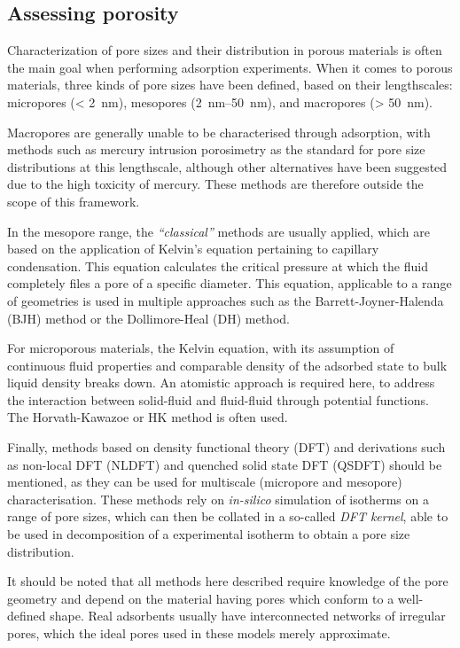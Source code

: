 
\subsection{Assessing porosity}

Characterization of pore sizes and their distribution in porous materials
is often the main goal when performing adsorption experiments.
When it comes to porous materials, three kinds of pore sizes have been
defined, based on their lengthscales: micropores (\SI{< 2}{\nano\metre}),
mesopores (\SIrange{2}{50}{\nano\metre}), and macropores (\SI{> 50}{\nano\metre}).

Macropores are generally unable to be characterised through adsorption,
with methods such as mercury intrusion porosimetry as the standard for pore
size distributions at this lengthscale, although other alternatives have
been suggested~\cite{rouquerolCharacterizationMacroporousSolids2012} due
to the high toxicity of mercury. These methods are therefore outside
the scope of this framework.

In the mesopore range, the \textit{``classical''} methods are usually
applied, which are based on the application of Kelvin's equation
pertaining to capillary condensation. This equation calculates the
critical pressure at which the fluid completely files a pore of a
specific diameter. This equation, applicable to a range of geometries
is used in multiple approaches such as the Barrett-Joyner-Halenda
(BJH) method or the Dollimore-Heal (DH) method.

For microporous materials, the Kelvin equation, with its assumption
of continuous fluid properties and comparable density of the adsorbed
state to bulk liquid density breaks down. An atomistic approach
is required here, to address the interaction between solid-fluid
and fluid-fluid through potential functions. The Horvath-Kawazoe or
HK method is often used.

Finally, methods based on density functional theory (DFT) and
derivations such as non-local DFT (NLDFT) and quenched solid state DFT
(QSDFT) should be mentioned, as they can be used for multiscale
(micropore and mesopore) characterisation. These methods rely on
\textit{in-silico} simulation of isotherms on a range of pore sizes,
which can then be collated in a so-called \textit{DFT kernel}, able to
be used in decomposition of a experimental isotherm to obtain a
pore size distribution.

It should be noted that all methods here described require knowledge of
the pore geometry and depend on the material having pores which
conform to a well-defined shape. Real adsorbents usually have
interconnected networks of irregular pores, which the ideal pores
used in these models merely approximate.

